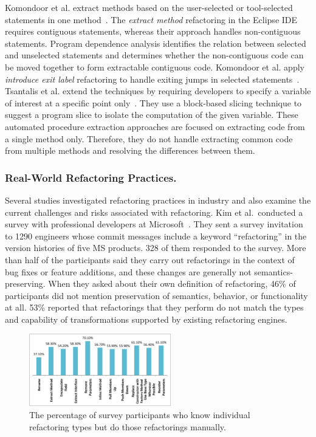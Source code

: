 
Komondoor et al.\/ extract methods based on the user-selected or tool-selected statements in one method~\cite{Komondoor2000, Komondoor2003}. The {\em extract method} refactoring in the Eclipse IDE requires contiguous statements, whereas their approach handles non-contiguous statements. Program dependence analysis identifies the relation between selected and unselected statements and determines whether the non-contiguous code can be moved together to form extractable contiguous code. Komondoor et al.\/ apply {\em introduce exit label} refactoring to handle exiting jumps in selected statements~\cite{Komondoor2003}. Tsantalis et al.\/ extend the techniques by requiring developers to specify a variable of interest at a specific point only~\cite{tsantalis2011identification}. They use a block-based slicing technique to suggest a program slice to isolate the computation of the given variable. These automated procedure extraction approaches are focused on extracting code from a single method only. Therefore, they do not handle extracting common code from multiple methods and resolving the differences between them. 

\subsubsection{Real-World Refactoring Practices.} 
\label{sec:refactoringpractice} 

Several studies investigated refactoring practices in industry and also examine the current challenges and risks associated with refactoring. Kim et al.~conducted a survey with professional developers at Microsoft~\cite{Kim2012:FSR, Kim2014:EmpiricalStudy}. They sent a survey invitation to 1290 engineers whose commit messages include a keyword ``refactoring'' in the version histories of five MS products. 328 of them responded to the survey. More than half of the participants said they carry out refactorings in the context of bug fixes or feature additions, and these changes are generally not semantics-preserving. When they asked about their own definition of refactoring, 46\% of participants did not mention preservation of semantics, behavior, or functionality at all. 53\% reported that refactorings that they perform do not match the types and capability of transformations supported by existing refactoring engines. 

\begin{figure}[!htb]
\centering
    \includegraphics[width=0.55\textwidth]{images/manualRefactoring.pdf}
    \caption{The percentage of survey participants who know individual refactoring types but do those refactorings manually.\cite{Kim2014:EmpiricalStudy}}  
\label{fig:manualRefactoring} 
\end{figure} 

